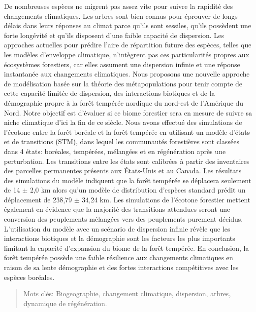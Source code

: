 \resume
\begin{singlespace}

  De nombreuses espèces ne migrent pas assez vite pour suivre la rapidité des changements climatiques. Les arbres sont bien connus pour éprouver de longs délais dans leurs réponses au climat parce qu'ils sont sessiles, qu'ils possèdent une forte longévité et qu'ils disposent d'une faible capacité de dispersion. Les approches actuelles pour prédire l'aire de répartition future des espèces, telles que les modèles d'enveloppe climatique, n'intègrent pas ces particularités propres aux écosystèmes forestiers, car elles assument une dispersion infinie et une réponse instantanée aux changements climatiques. Nous proposons une nouvelle approche de modélisation basée sur la théorie des métapopulations pour tenir compte de cette capacité limitée de dispersion, des interactions biotiques et de la démographie propre à la forêt tempérée nordique du nord-est de l'Amérique du Nord. Notre objectif est d'évaluer si ce biome forestier sera en mesure de suivre sa niche climatique d'ici la fin de ce siècle. Nous avons effectué des simulations de l'écotone entre la forêt boréale et la forêt tempérée en utilisant un modèle d'états et de transitions (STM), dans lequel les communautés forestières sont classées dans 4 états: boréales, tempérées, mélangées et en régénération après une perturbation. Les transitions entre les états sont calibrées à partir des inventaires des parcelles permanentes présents aux États-Unis et au Canada. Les résultats des simulations du modèle indiquent que la forêt tempérée se déplacera seulement de 14 $\pm$ 2,0 km alors qu'un modèle de distribution d'espèces standard prédit un déplacement de 238,79 $\pm$ 34,24 km. Les simulations de l'écotone forestier mettent également en évidence que la majorité des transitions attendues seront une conversion des peuplements mélangées vers des peuplements purement décidus. L'utilisation du modèle avec un scénario de dispersion infinie révèle que les interactions biotiques et la démographie sont les facteurs les plus importants limitant la capacité d'expansion du biome de la forêt tempérée. En conclusion, la forêt tempérée possède une faible résilience aux changements climatiques en raison de sa lente démographie et des fortes interactions compétitives avec les espèces boréales.

  \begin{quote}
    Mots clés: Biogeographie, changement climatique, dispersion, arbres, dynamique de régénération.
  \end{quote}
\end{singlespace}
\cleardoublepage

